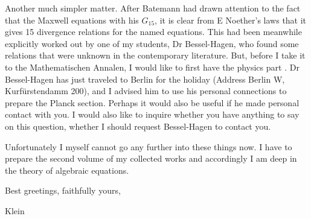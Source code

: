 \begin{letter}{10}
Another much simpler matter. After Batemann had drawn attention to the fact that the Maxwell equations  with his $G_{15}$, it is clear from E Noether's laws that it gives 15 divergence relations for the named equations. This had been meanwhile explicitly worked out by one of my students, Dr Bessel-Hagen, who found some relations that were unknown in the contemporary literature. But, before I take it to the Mathematischen Annalen, I would like to first have the physics part . Dr Bessel-Hagen has just traveled to Berlin for the holiday (Address Berlin W, Kurfürstendamm 200), and I advised him to use his personal connections to prepare the Planck section. Perhaps it would also be useful if he made personal contact with you. I would also like to inquire whether you have anything to say on this question,  whether I should request Bessel-Hagen to contact you.

Unfortunately I myself cannot go any further into these things now. I have to prepare the second volume of my collected works and accordingly I am deep in the theory of algebraic equations.

Best greetings, faithfully yours,

Klein

\end{letter}